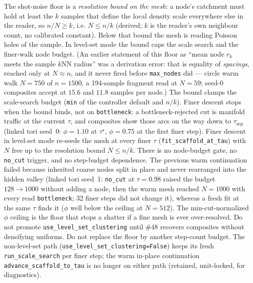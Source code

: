 \documentclass[11pt]{article}
\begin{document}
The shot-noise floor is a \emph{resolution bound on the mesh}: a node's
catchment must hold at least the $k$ samples that define the local
density scale everywhere else in the reader, so $n/N\ge k$, i.e.
$N\le n/k$ (derived; $k$ is the reader's own neighbour count, no
calibrated constant). Below that bound the mesh is reading Poisson
holes of the sample. In level-set mode the bound caps the scale search
and the finer-walk node budget. (An earlier statement of this floor as
``mean node $r_k$ meets the sample $k$NN radius'' was a derivation
error: that is equality of \emph{spacings}, reached only at $N\approx
n$, and it never fired before \texttt{max\_nodes} did --- circle warm
walk $N{=}750$ of $n{=}1500$, a 194-sample fragment read at $N{=}59$;
seed-0 composites accept at $15.6$ and $11.8$
samples per node.) The bound clamps the scale-search budget
(\texttt{min} of the controller default and $n/k$). Finer descent
stops when the bound binds, not on
\texttt{bottleneck}: a bottleneck-rejected cut is manifold traffic at
the current $\tau$, and composites show those arcs on the way down to
$\tau_{\mathrm{sep}}$ (linked tori seed~0: $\phi{=}1.10$ at $\tau^\star$,
$\phi{=}0.75$ at the first finer step).
Finer descent in level-set mode re-seeds the mesh at every finer
$\tau$ (\texttt{fit\_scaffold\_at\_tau}) with $N$ free up to the
resolution bound $N\le n/k$. There is no node-budget gate, no
\texttt{no\_cut} trigger, and no step-budget dependence.
The previous warm continuation failed because inherited coarse nodes
split in place and never rearranged into the hidden valley (linked
tori seed~1: \texttt{no\_cut} at $\tau{=}0.98$ raised the budget
$128\to 1000$ without adding a node, then the warm mesh reached
$N{=}1000$ with every read \texttt{bottleneck};
32 finer steps did not change it), whereas a fresh fit at the same
$\tau$ finds it ($\phi$ well below the ceiling at $N{=}512$).
The min-cut-normalized $\phi$ ceiling is the floor that stops a shatter
if a fine mesh is ever over-resolved.
Do not promote \texttt{use\_level\_set\_clustering} until \#48
recovers composites without densifying uniforms.
Do not replace the floor by another step-count budget.
The non-level-set path (\texttt{use\_level\_set\_clustering=False})
keeps its fresh \texttt{run\_scale\_search} per finer step; the warm
in-place continuation \texttt{advance\_scaffold\_to\_tau} is no longer
on either path (retained, unit-locked, for diagnostics).
\end{document}

